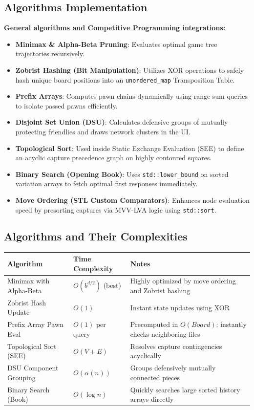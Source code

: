 \documentclass[12pt,a4paper]{article}
\begin{document}
\subsection{Algorithms Implementation}
\textbf{General algorithms and Competitive Programming integrations:}
\begin{itemize}
    \item \textbf{Minimax \& Alpha-Beta Pruning}: Evaluates optimal game tree trajectories recursively.
    \item \textbf{Zobrist Hashing (Bit Manipulation)}: Utilizes XOR operations to safely hash unique board positions into an \texttt{unordered\_map} Transposition Table.
    \item \textbf{Prefix Arrays}: Computes pawn chains dynamically using range sum queries to isolate passed pawns efficiently.
    \item \textbf{Disjoint Set Union (DSU)}: Calculates defensive groups of mutually protecting friendlies and draws network clusters in the UI.
    \item \textbf{Topological Sort}: Used inside Static Exchange Evaluation (SEE) to define an acyclic capture precedence graph on highly contoured squares.
    \item \textbf{Binary Search (Opening Book)}: Uses \texttt{std::lower\_bound} on sorted variation arrays to fetch optimal first responses immediately.
    \item \textbf{Move Ordering (STL Custom Comparators)}: Enhances node evaluation speed by presorting captures via MVV-LVA logic using \texttt{std::sort}.
\end{itemize}

\subsection{Algorithms and Their Complexities}
\begin{longtable}{|p{4cm}|p{3.5cm}|p{6cm}|}
\hline
\textbf{Algorithm} & \textbf{Time Complexity} & \textbf{Notes} \\
\hline
Minimax with Alpha-Beta & $O(b^{d/2})$ (best) & Highly optimized by move ordering and Zobrist hashing \\
\hline
Zobrist Hash Update & $O(1)$ & Instant state updates using XOR \\
\hline
Prefix Array Pawn Eval & $O(1)$ per query & Precomputed in $O(Board)$; instantly checks neighboring files \\
\hline
Topological Sort (SEE) & $O(V + E)$ & Resolves capture contingencies acyclically \\
\hline
DSU Component Grouping & $O(\alpha(n))$ & Groups defensively mutually connected pieces \\
\hline
Binary Search (Book) & $O(\log n)$ & Quickly searches large sorted history arrays directly \\
\hline
\end{longtable}
\end{document}
